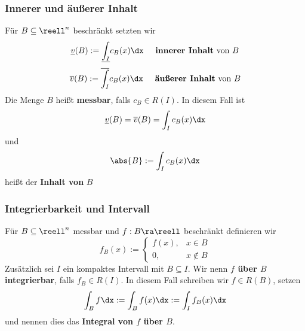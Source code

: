 \documentclass{kit}
\begin{document}
    \subsubsection{Innerer und äußerer Inhalt}
      Für $B\subseteq\reell^n$ beschränkt setzten wir
      $$\underline{v}(B):=\underline{\int_I}c_B(x)\dx\hspace{0.5cm}\textbf{innerer Inhalt}\text{ von }B$$
      $$\overline{v}(B):=\overline{\int_I}c_B(x)\dx\hspace{0.5cm}\textbf{äußerer Inhalt}\text{ von }B$$
      Die Menge $B$ heißt \textbf{messbar}, falls $c_B\in R(I)$. In diesem Fall ist
      $$\underline{v}(B)=\overline{v}(B)=\int_Ic_B(x)\dx$$
      und
      $$\abs{B}:=\int_Ic_B(x)\dx$$
      heißt der \textbf{Inhalt von} $B$
    \subsubsection{Integrierbarkeit und Intervall}
      Für $B\subseteq\reell^n$ messbar und $f:B\ra\reell$ beschränkt definieren wir
      $$f_B(x):=\begin{cases}
        f(x), & x\in B\\
        0, & x\notin B
      \end{cases}$$
      Zusätzlich sei $I$ ein kompaktes Intervall mit $B\subseteq I$. Wir nenn \textbf{$f$ über $B$ integrierbar}, falls
      $f_B\in R(I)$. In diesem Fall schreiben wir $f\in R(B)$, setzen
      $$\int_Bf\dx:=\int_Bf(x)\dx:=\int_If_B(x)\dx$$
      und nennen dies das \textbf{Integral von $f$ über $B$}.
\end{document}
